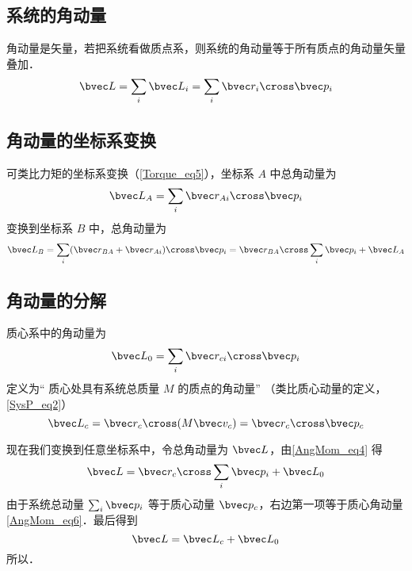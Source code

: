 

\subsection{系统的角动量}
角动量是矢量，若把系统看做质点系，则系统的角动量等于所有质点的角动量矢量叠加．
\begin{equation}
\bvec L = \sum_i \bvec L_i = \sum_i \bvec r_i \cross\bvec p_i
\end{equation}

\subsection{角动量的坐标系变换}
可类比力矩的坐标系变换（\autoref{Torque_eq5}），坐标系 $A$ 中总角动量为
\begin{equation}
\bvec L_A = \sum_i \bvec r_{Ai} \cross \bvec p_i 
\end{equation}
变换到坐标系 $B$ 中，总角动量为
\begin{equation}\label{AngMom_eq4}
\bvec L_B = \sum_i (\bvec r_{BA} + \bvec r_{Ai})\cross \bvec p_i = \bvec r_{BA}\cross \sum_i \bvec p_i + \bvec L_A
\end{equation}

\subsection{角动量的分解}
质心系中的角动量为
\begin{equation}\label{AngMom_eq5}
\bvec L_0 = \sum_i \bvec r_{ci} \cross \bvec p_i
\end{equation}
定义为“ 质心处具有系统总质量 $M$ 的质点的角动量” （类比质心动量的定义， \autoref{SysP_eq2}）
\begin{equation}\label{AngMom_eq6}
\bvec L_c  = \bvec r_c \cross (M \bvec v_c) = \bvec r_c \cross \bvec p_c
\end{equation}

现在我们变换到任意坐标系中，令总角动量为 $\bvec L$，由\autoref{AngMom_eq4} 得
\begin{equation}
\bvec L = \bvec r_{c} \cross \sum_i \bvec p_i + \bvec L_0
\end{equation}
由于系统总动量 $\sum_i \bvec p_i$ 等于质心动量 $\bvec p_c$，右边第一项等于质心角动量\autoref{AngMom_eq6}．最后得到
\begin{equation}
\bvec L = \bvec L_c + \bvec L_0
\end{equation}
所以．
